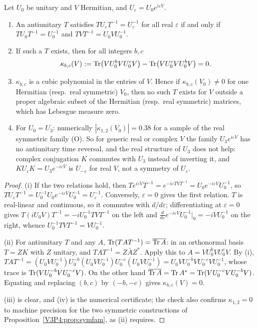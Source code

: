 \begin{proposition}\label{V3P4:prop:noT}
Let $U_0$ be unitary and $V$ Hermitian, and $U_\varepsilon=U_0e^{i\varepsilon V}$.
\begin{enumerate}
\item[(i)] An antiunitary $T$ satisfies $TU_\varepsilon T^{-1}=U_\varepsilon^{-1}$ for all real
$\varepsilon$ if and only if $TU_0T^{-1}=U_0^{-1}$ and $TVT^{-1}=U_0VU_0^{-1}$.
\item[(ii)] If such a $T$ exists, then for all integers $b,c$
\[
\kappa_{b,c}(V):=\operatorname{Tr}\bigl(VU_0^{b}VU_0^{c}V\bigr)-\operatorname{Tr}\bigl(VU_0^{c}VU_0^{b}V\bigr)=0 .
\]
\item[(iii)] $\kappa_{b,c}$ is a cubic polynomial in the entries of $V$. Hence if
$\kappa_{b,c}(V_0)\ne0$ for one Hermitian (resp.\ real symmetric) $V_0$, then no such $T$ exists
for $V$ outside a proper algebraic subset of the Hermitian (resp.\ real symmetric) matrices, which
has Lebesgue measure zero.
\item[(iv)] For $U_0=U_3$: numerically $|\kappa_{1,2}(V_0)|=0.38$ for a sample of the real
symmetric family (O). So for generic real or complex $V$ the family $U_3e^{i\varepsilon V}$ has no
antiunitary time reversal, and the real structure of $U_3$ does not help: complex conjugation
$K$ commutes with $U_3$ instead of inverting it, and $KU_\varepsilon K=U_3e^{-i\varepsilon\bar V}$
is $U_{-\varepsilon}$ for real $V$, not a symmetry of $U_\varepsilon$.
\end{enumerate}
\end{proposition}

\begin{proof}
(i) If the two relations hold, then
$Te^{i\varepsilon V}T^{-1}=e^{-i\varepsilon TVT^{-1}}=U_0e^{-i\varepsilon V}U_0^{-1}$, so
$TU_\varepsilon T^{-1}=U_0^{-1}U_0e^{-i\varepsilon V}U_0^{-1}=U_\varepsilon^{-1}$. Conversely,
$\varepsilon=0$ gives the first relation. $T$ is real-linear and continuous, so it commutes with
$d/d\varepsilon$; differentiating at $\varepsilon=0$ gives
$T(iU_0V)T^{-1}=-iU_0^{-1}TVT^{-1}$ on the left and
$\frac{d}{d\varepsilon}e^{-i\varepsilon V}U_0^{-1}|_{0}=-iVU_0^{-1}$ on the right, whence
$U_0^{-1}TVT^{-1}=VU_0^{-1}$.

(ii) For antiunitary $T$ and any $A$, $\operatorname{Tr}(TAT^{-1})=\overline{\operatorname{Tr} A}$: in an orthonormal
basis $T=ZK$ with $Z$ unitary, and $TAT^{-1}=Z\bar AZ^{*}$. Apply this to
$A=VU_0^{b}VU_0^{c}V$. By (i),
$TAT^{-1}=(U_0VU_0^{-1})U_0^{-b}(U_0VU_0^{-1})U_0^{-c}(U_0VU_0^{-1})=U_0VU_0^{-b}VU_0^{-c}VU_0^{-1}$,
whose trace is $\operatorname{Tr}(VU_0^{-b}VU_0^{-c}V)$. On the other hand
$\overline{\operatorname{Tr} A}=\operatorname{Tr} A^{*}=\operatorname{Tr}(VU_0^{-c}VU_0^{-b}V)$. Equating and replacing $(b,c)$ by
$(-b,-c)$ gives $\kappa_{b,c}(V)=0$.

(iii) is clear, and (iv) is the numerical certificate; the check also confirms
$\kappa_{1,2}=0$ to machine precision for the two symmetric constructions of
Proposition~\ref{V3P4:prop:symfam}, as (ii) requires.
\end{proof}

